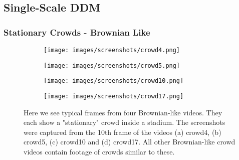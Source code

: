 \documentclass[10pt]{article}
\begin{document}
\subsection{Single-Scale DDM}
\subsubsection{Stationary Crowds - Brownian Like}

\begin{figure}[H]
\begin{subfigure}[t]{.49\textwidth}
  \centering
  \texttt{[image: images/screenshots/crowd4.png]}
  \label{fig:crowd4_screenshot}
  \caption{}
\end{subfigure}%
\hfill
\begin{subfigure}[t]{.49\textwidth}
  \centering
  \texttt{[image: images/screenshots/crowd5.png]}
  \label{fig:crowd5_screenshot}
  \caption{}
\end{subfigure}
\par\bigskip
\begin{subfigure}[t]{.49\textwidth}
  \centering
  \texttt{[image: images/screenshots/crowd10.png]}
  \label{fig:crowd10_screenshot}
  \caption{}
\end{subfigure}%
\hfill
\begin{subfigure}[t]{.49\textwidth}
  \centering
  \texttt{[image: images/screenshots/crowd17.png]}
  \label{fig:crowd17_screenshot}
  \caption{}
\end{subfigure}%
\caption{Here we see typical frames from four Brownian-like videos. They each show a "stationary" crowd inside a stadium. The screenshots were captured from the 10th frame of the videos (a) crowd4, (b) crowd5, (c) crowd10 and (d) crowd17. All other Brownian-like crowd videos contain footage of crowds similar to these.}
\label{fig:crowd_screenshots}
\end{figure}
\end{document}
